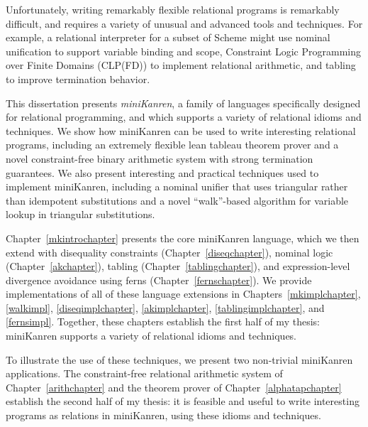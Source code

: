 

Unfortunately, writing remarkably flexible relational programs is
remarkably difficult, and requires a variety of unusual and advanced
tools and techniques.  For example, a relational interpreter for a
subset of Scheme might use nominal unification to support variable
binding and scope, Constraint Logic Programming over Finite Domains
(CLP(FD)) to implement relational arithmetic, and tabling to improve
termination behavior.

This dissertation presents {\em miniKanren}, a family of languages
specifically designed for relational programming, and which supports a
variety of relational idioms and techniques.  We show how miniKanren
can be used to write interesting relational programs, including an
extremely flexible lean tableau theorem prover and a novel
constraint-free binary arithmetic system with strong termination
guarantees.  We also present interesting and practical techniques used
to implement miniKanren, including a nominal unifier that uses
triangular rather than idempotent substitutions and a novel
``walk''-based algorithm for variable lookup in triangular
substitutions.

Chapter~\ref{mkintrochapter} presents the core miniKanren language,
which we then extend with disequality constraints
(Chapter~\ref{diseqchapter}), nominal logic (Chapter~\ref{akchapter}),
tabling (Chapter~\ref{tablingchapter}), and expression-level
divergence avoidance using ferns (Chapter~\ref{fernschapter}).  We
provide implementations of all of these language extensions in
Chapters~\ref{mkimplchapter}, \ref{walkimpl}, \ref{diseqimplchapter},
\ref{akimplchapter}, \ref{tablingimplchapter}, and \ref{fernsimpl}.
Together, these chapters establish the first half of my thesis:
miniKanren supports a variety of relational idioms and techniques.

To illustrate the use of these techniques, we present two
non-trivial miniKanren applications.  The constraint-free relational
arithmetic system of Chapter~\ref{arithchapter} and the theorem prover
of Chapter~\ref{alphatapchapter}
establish the second half of my thesis:
it is feasible and useful to write interesting programs as relations
in miniKanren, using these idioms and techniques.

